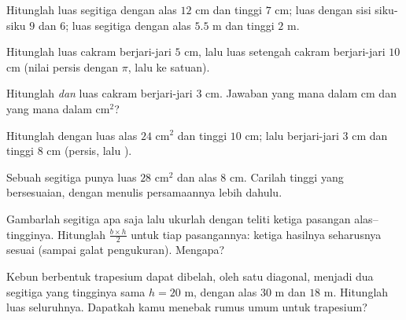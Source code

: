 \begin{exercise}[$\star$]\label{exo:g7:areas:3}
Hitunglah luas segitiga dengan alas $12$ cm dan tinggi $7$ cm; luas
 dengan sisi siku-siku $9$ dan $6$; luas segitiga
dengan alas $5.5$ m dan tinggi $2$ m.
\end{exercise}

\begin{exercise}[$\star$]\label{exo:g7:areas:4}
Hitunglah luas cakram berjari-jari $5$ cm, lalu luas setengah cakram
berjari-jari $10$ cm (nilai persis dengan $\pi$, lalu  ke satuan).
\end{exercise}

\begin{exercise}[$\star$]\label{exo:g7:areas:5}
Hitunglah  \emph{dan} luas cakram berjari-jari $3$ cm.
Jawaban yang mana dalam cm dan yang mana dalam cm$^2$?
\end{exercise}

\begin{exercise}[$\star$]\label{exo:g7:areas:6}
Hitunglah   dengan luas alas $24$ cm$^2$ dan tinggi
$10$ cm; lalu   berjari-jari $3$ cm dan tinggi $8$ cm
(persis, lalu ).
\end{exercise}

\begin{exercise}[$\star$]\label{exo:g7:areas:7}
Sebuah segitiga punya luas $28$ cm$^2$ dan alas $8$ cm. Carilah tinggi
yang bersesuaian, dengan menulis persamaannya lebih dahulu.
\end{exercise}

\begin{exercise}[$\star\star$]\label{exo:g7:areas:8}
Gambarlah segitiga apa saja lalu ukurlah dengan teliti ketiga pasangan
alas--tingginya. Hitunglah $\frac{b \times h}{2}$ untuk tiap
pasangannya: ketiga hasilnya seharusnya sesuai (sampai galat
pengukuran). Mengapa?
\end{exercise}

\begin{exercise}[$\star\star$]\label{exo:g7:areas:9}
Kebun berbentuk trapesium dapat dibelah, oleh satu diagonal, menjadi
dua segitiga yang tingginya sama $h = 20$ m, dengan alas $30$ m dan
$18$ m. Hitunglah luas seluruhnya. Dapatkah kamu menebak rumus umum
untuk trapesium?
\end{exercise}

